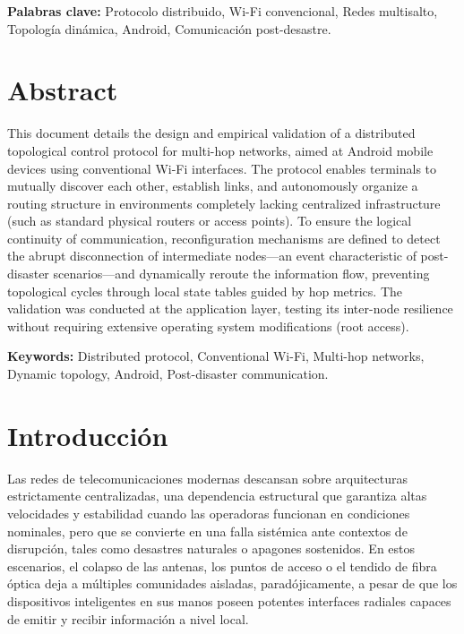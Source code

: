 \documentclass[12pt,oneside]{scrreprt}
\begin{document}
\vspace{0.5cm}
\textbf{Palabras clave:} Protocolo distribuido, Wi-Fi convencional, Redes multisalto, Topología dinámica, Android, Comunicación post-desastre.

\chapter*{Abstract}
This document details the design and empirical validation of a distributed topological control protocol for multi-hop networks, aimed at Android mobile devices using conventional Wi-Fi interfaces. The protocol enables terminals to mutually discover each other, establish links, and autonomously organize a routing structure in environments completely lacking centralized infrastructure (such as standard physical routers or access points). To ensure the logical continuity of communication, reconfiguration mechanisms are defined to detect the abrupt disconnection of intermediate nodes---an event characteristic of post-disaster scenarios---and dynamically reroute the information flow, preventing topological cycles through local state tables guided by hop metrics. The validation was conducted at the application layer, testing its inter-node resilience without requiring extensive operating system modifications (root access).

\vspace{0.5cm}
\textbf{Keywords:} Distributed protocol, Conventional Wi-Fi, Multi-hop networks, Dynamic topology, Android, Post-disaster communication.

\clearpage
{}
\pagestyle{scrheadings}
\renewcommand*{\chapterpagestyle}{plain}
\chapter*{Introducción}
Las redes de telecomunicaciones modernas descansan sobre arquitecturas estrictamente centralizadas, una dependencia estructural que garantiza altas velocidades y estabilidad cuando las operadoras funcionan en condiciones nominales, pero que se convierte en una falla sistémica ante contextos de disrupción, tales como desastres naturales o apagones sostenidos. En estos escenarios, el colapso de las antenas, los puntos de acceso o el tendido de fibra óptica deja a múltiples comunidades aisladas, paradójicamente, a pesar de que los dispositivos inteligentes en sus manos poseen potentes interfaces radiales capaces de emitir y recibir información a nivel local.
\end{document}
